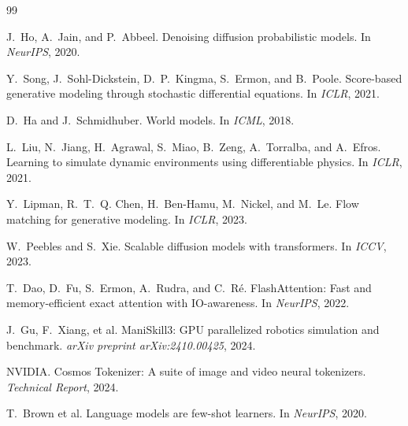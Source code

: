 \documentclass[letterpaper,twocolumn,10pt]{article}
\begin{document}
\begin{thebibliography}{99}

J.~Ho, A.~Jain, and P.~Abbeel.
\newblock Denoising diffusion probabilistic models.
\newblock In \emph{NeurIPS}, 2020.

Y.~Song, J.~Sohl-Dickstein, D.~P.~Kingma, S.~Ermon, and B.~Poole.
\newblock Score-based generative modeling through stochastic differential
  equations.
\newblock In \emph{ICLR}, 2021.

D.~Ha and J.~Schmidhuber.
\newblock World models.
\newblock In \emph{ICML}, 2018.

L.~Liu, N.~Jiang, H.~Agrawal, S.~Miao, B.~Zeng, A.~Torralba, and
  A.~Efros.
\newblock Learning to simulate dynamic environments using differentiable
  physics.
\newblock In \emph{ICLR}, 2021.

Y.~Lipman, R.~T.~Q. Chen, H.~Ben-Hamu, M.~Nickel, and M.~Le.
\newblock Flow matching for generative modeling.
\newblock In \emph{ICLR}, 2023.

W.~Peebles and S.~Xie.
\newblock Scalable diffusion models with transformers.
\newblock In \emph{ICCV}, 2023.

T.~Dao, D.~Fu, S.~Ermon, A.~Rudra, and C.~R\'e.
\newblock FlashAttention: Fast and memory-efficient exact attention with
  IO-awareness.
\newblock In \emph{NeurIPS}, 2022.

J.~Gu, F.~Xiang, et al.
\newblock ManiSkill3: GPU parallelized robotics simulation and benchmark.
\newblock \emph{arXiv preprint arXiv:2410.00425}, 2024.

NVIDIA.
\newblock Cosmos Tokenizer: A suite of image and video neural tokenizers.
\newblock \emph{Technical Report}, 2024.

T.~Brown et al.
\newblock Language models are few-shot learners.
\newblock In \emph{NeurIPS}, 2020.

\end{thebibliography}
\end{document}
